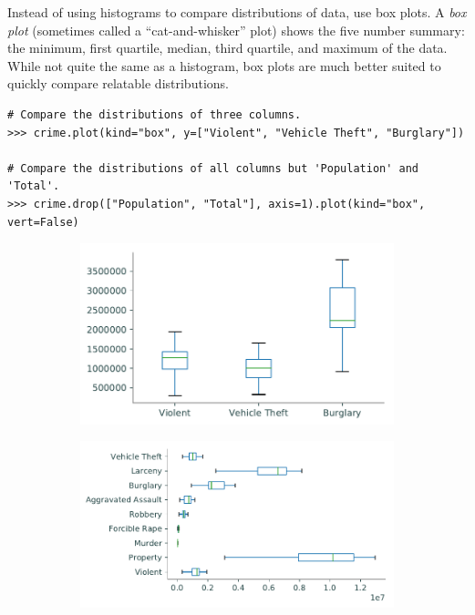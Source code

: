 Instead of using histograms to compare distributions of data, use box plots.
A \emph{box plot} (sometimes called a ``cat-and-whisker'' plot) shows the five number summary: the minimum, first quartile, median, third quartile, and maximum of the data.
While not quite the same as a histogram, box plots are much better suited to quickly compare relatable distributions.

\begin{lstlisting}
# Compare the distributions of three columns.
>>> crime.plot(kind="box", y=["Violent", "Vehicle Theft", "Burglary"])

# Compare the distributions of all columns but 'Population' and 'Total'.
>>> crime.drop(["Population", "Total"], axis=1).plot(kind="box", vert=False)
\end{lstlisting}

\begin{figure}[H] %
\captionsetup[subfigure]{justification=centering}
\centering
\begin{subfigure}{.49\textwidth}
    \includegraphics[width=\textwidth]{figures/box_small.pdf}
\end{subfigure}
%
\begin{subfigure}{.49\textwidth}
    \includegraphics[width=\textwidth]{figures/box_large.pdf}
\end{subfigure}
\end{figure}

